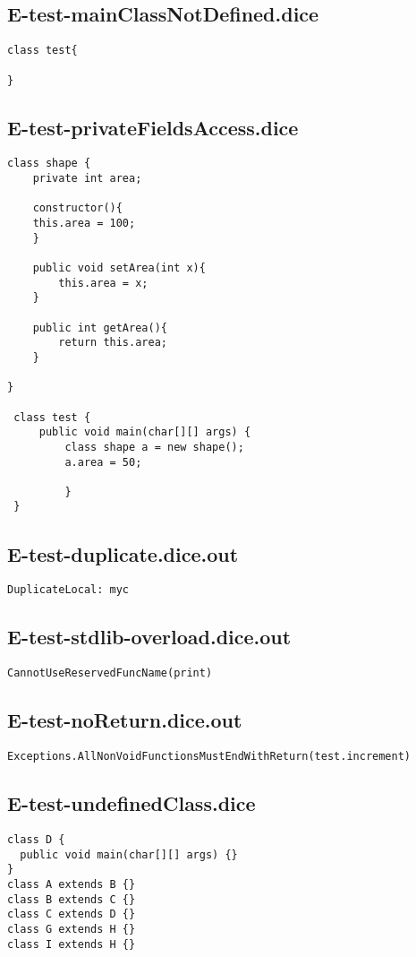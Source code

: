 \subsection{E-test-mainClassNotDefined.dice}
\begin{verbatim}
class test{
	
}
\end{verbatim}
\pagebreak
\subsection{E-test-privateFieldsAccess.dice}
\begin{verbatim}
class shape {
	private int area;

	constructor(){
	this.area = 100;
	}

	public void setArea(int x){
		this.area = x;
	}

	public int getArea(){
		return this.area;
	}
	
}

 class test {
	 public void main(char[][] args) {
		 class shape a = new shape();
		 a.area = 50;
		 
		 }
 }
\end{verbatim}
\pagebreak
\subsection{E-test-duplicate.dice.out}
\begin{verbatim}
DuplicateLocal: myc

\end{verbatim}
\pagebreak
\subsection{E-test-stdlib-overload.dice.out}
\begin{verbatim}
CannotUseReservedFuncName(print)

\end{verbatim}
\pagebreak
\subsection{E-test-noReturn.dice.out}
\begin{verbatim}
Exceptions.AllNonVoidFunctionsMustEndWithReturn(test.increment)

\end{verbatim}
\pagebreak
\subsection{E-test-undefinedClass.dice}
\begin{verbatim}
class D {
  public void main(char[][] args) {}
}
class A extends B {}
class B extends C {}
class C extends D {}
class G extends H {}
class I extends H {}
\end{verbatim}
\pagebreak
